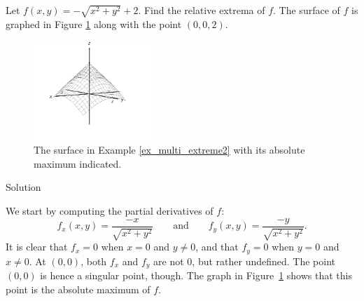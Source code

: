 \begin{example}\label{ex_multi_extreme2}
Let $f(x,y) = -\sqrt{x^2+y^2}+2$. Find the relative extrema of $f$. The surface of $f$ is graphed in Figure \ref{fig_multi_var_22} along with the point $(0,0,2)$.

\begin{figure}[H]
	\begin{center}
			\includegraphics[width=0.4\textwidth]{fig_multi_var_24}
	\caption{The surface in Example \ref{ex_multi_extreme2} with its absolute maximum indicated.}
	\label{fig_multi_var_22}
	\end{center}
\end{figure}

Solution 

We start by computing the partial derivatives of $f$:
$$f_x(x,y) = \frac{-x}{\sqrt{x^2+y^2}}\qquad \text{and}\qquad f_y(x,y) = \frac{-y}{\sqrt{x^2+y^2}}.$$
It is clear that $f_x=0$ when $x=0$ and $y\neq0$, and that $f_y=0$ when $y=0$ and $x\neq0$. At $(0,0)$, both $f_x$ and $f_y$ are not $0$, but rather undefined. The point $(0,0)$ is hence a singular point, though.  The graph in Figure~\ref{fig_multi_var_22} shows that this point is the absolute maximum of $f$.
\end{example}





